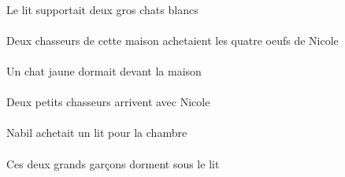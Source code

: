 \begin{exe}
\DEFSgErgP{}   \litDSgErgP{}   \INDDuAbsP{}   \grosDDuP{}   \blancDDuP{}   \chatDDuAbsP{}  \supporterVtPstDDuP{}\\
Le lit supportait deux gros chats blancs
\ex\gll
\INDDuErg{}    \DEMSgObl{}   \maisonDSgObl{}   \DE{}   \chasseurCDuErg{}   \DEFPlAbs{}    \INDSgObl{}   \NicoleBSgObl{}   \DE{}   \quatreCPl{}   \oeufCPlAbs{}  \acheterVtPstCPl{}\\
\INDDuErgP{}    \DEMSgOblP{}   \maisonDSgOblP{}   \DEP{}   \chasseurCDuErgP{}   \DEFPlAbsP{}    \INDSgOblP{}   \NicoleBSgOblP{}   \DEP{}   \quatreCPlP{}   \oeufCPlAbsP{}  \acheterVtPstCPlP{}\\
Deux chasseurs de cette maison achetaient les quatre oeufs de Nicole
\ex\gll
\INDSgAbs{}   \jauneDSg{}   \chatDSgAbs{}    \DEFSgObl{}   \maisonDSgObl{}   \DEVANT{}  \dormirViPstDSg{}\\
\INDSgAbsP{}   \jauneDSgP{}   \chatDSgAbsP{}    \DEFSgOblP{}   \maisonDSgOblP{}   \DEVANTP{}  \dormirViPstDSgP{}\\
Un chat jaune dormait devant la maison
\ex\gll
\INDSgObl{}   \NicoleBSgObl{}   \AVEC{}   \INDDuAbs{}   \petitCDu{}   \chasseurCDuAbs{}  \arriverViPrsCDu{}\\
\INDSgOblP{}   \NicoleBSgOblP{}   \AVECP{}   \INDDuAbsP{}   \petitCDuP{}   \chasseurCDuAbsP{}  \arriverViPrsCDuP{}\\
Deux petits chasseurs arrivent avec Nicole
\ex\gll
\INDSgErg{}   \NabilDSgErg{}    \DEFSgObl{}   \chambreBSgObl{}   \POUR{}   \INDSgAbs{}   \litDSgAbs{}  \acheterVtPstDSg{}\\
\INDSgErgP{}   \NabilDSgErgP{}    \DEFSgOblP{}   \chambreBSgOblP{}   \POURP{}   \INDSgAbsP{}   \litDSgAbsP{}  \acheterVtPstDSgP{}\\
Nabil achetait un lit pour la chambre
\ex\gll
\DEMDuAbs{}   \grandDDu{}   \garconDDuAbs{}    \DEFSgObl{}   \litDSgObl{}   \SOUS{}  \dormirViPrsDDu{}\\
\DEMDuAbsP{}   \grandDDuP{}   \garconDDuAbsP{}    \DEFSgOblP{}   \litDSgOblP{}   \SOUSP{}  \dormirViPrsDDuP{}\\
Ces deux grands garçons dorment sous le lit
\ex\gll
\INDPlErg{}   \grandDPl{}   \garconDPlErg{}    \DEFPlDat{}    \DEFSgObl{}   \maisonDSgObl{}   \DE{}   \filleCPlDat{}   \INDPlAbs{}   \sourisBPlAbs{}  \montrerVdPstBPl{}\\
\INDPlErgP{}   \grandDPlP{}   \garconDPlErgP{}    \DEFPlDatP{}    \DEFSgOblP{}   \maisonDSgOblP{}   \DEP{}   \filleCPlDatP{}   \INDPlAbsP{}   \sourisBPlAbsP{}  \montrerVdPstBPlP{}\\

\end{exe}
